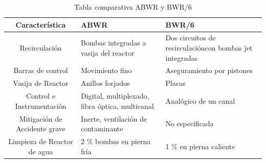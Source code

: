 \documentclass[]{article}
\begin{document}
\begin{table}[h!]
	\begin{tabular}{||c|p{5cm}|p{5cm}||}
		\hline
		\textbf{Característica}       & \textbf{ABWR}                                   & \textbf{BWR/6}                                          \\ \hline\hline
		Recirculación                 & Bombas integradas a vasija del reactor          & Dos circuitos de recirculacióncon bombas jet integradas \\ \hline
		Barras de control             & Movimiento fino                                 & Aseguramiento por pistones                               \\ \hline
		Vasija de Reactor             & Anillos forjados                                & Placas                                                  \\ \hline
		Control e Instrumentación     & Digital, multiplexado, fibra óptica, multicanal & Analógico de un canal                                   \\ \hline
		Mitigación de Accidente grave & Inerte, ventilación de contaminante             & No especificada                                         \\ \hline
		Limpieza de Reactor de agua   & 2 $\%$ bombas en pierna fría            & 1 $\%$ en pierna caliente                       \\ \hline
	\end{tabular}
\caption{Tabla comparativa ABWR y BWR/6}
\label{cuad:CompABWRyBWR6}
\end{table}




\end{document}
